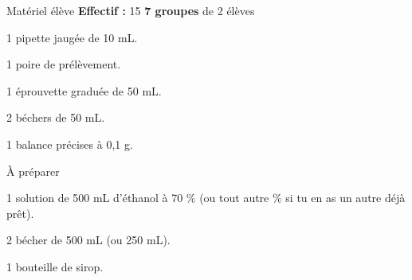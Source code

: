 
\begin{boiteMateriel}{Matériel élève}
  \textbf{Effectif :} 15
  \qq{}\qq{}
  \flecheLongue \textbf{7 groupes} de 2 élèves

  \begin{protocole}[2]
    \item 1 pipette jaugée de 10 mL.
    \item 1 poire de prélèvement.
    \item 1 éprouvette graduée de 50 mL.
    \item 2 béchers de 50 mL.
    \item 1 balance précises à 0,1 g.
    \item[\vspace{\fill}]
  \end{protocole}
\end{boiteMateriel}


\begin{boiteMateriel}{À préparer}
  \begin{protocole}
    \item 1 solution de 500 mL d'éthanol à 70 $\%$ (ou tout autre $\%$ si tu en as un autre déjà prêt).
    \item 2 bécher de 500 mL (ou 250 mL).
    \item 1 bouteille de sirop.
  \end{protocole}
\end{boiteMateriel}